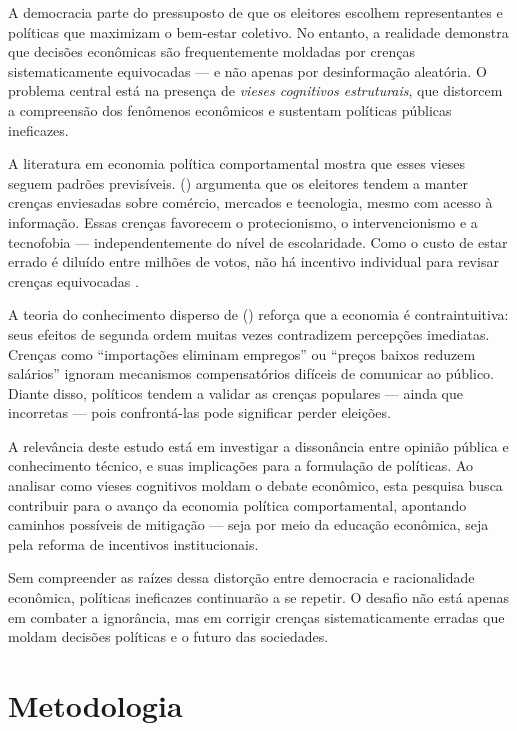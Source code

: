 A democracia parte do pressuposto de que os eleitores escolhem representantes e políticas que maximizam o bem-estar coletivo. No entanto, a realidade demonstra que decisões econômicas são frequentemente moldadas por crenças sistematicamente equivocadas — e não apenas por desinformação aleatória. O problema central está na presença de \textit{vieses cognitivos estruturais}, que distorcem a compreensão dos fenômenos econômicos e sustentam políticas públicas ineficazes.

A literatura em economia política comportamental mostra que esses vieses seguem padrões previsíveis.  (\citeyear{The_Myth_of_the_Rational_Voter}) argumenta que os eleitores tendem a manter crenças enviesadas sobre comércio, mercados e tecnologia, mesmo com acesso à informação. Essas crenças favorecem o protecionismo, o intervencionismo e a tecnofobia — independentemente do nível de escolaridade. Como o custo de estar errado é diluído entre milhões de votos, não há incentivo individual para revisar crenças equivocadas \cite{downs1957economic}.

A teoria do conhecimento disperso de  (\citeyear{hayek_knowledge_use}) reforça que a economia é contraintuitiva: seus efeitos de segunda ordem muitas vezes contradizem percepções imediatas. Crenças como ``importações eliminam empregos'' ou ``preços baixos reduzem salários'' ignoram mecanismos compensatórios difíceis de comunicar ao público. Diante disso, políticos tendem a validar as crenças populares — ainda que incorretas — pois confrontá-las pode significar perder eleições.

A relevância deste estudo está em investigar a dissonância entre opinião pública e conhecimento técnico, e suas implicações para a formulação de políticas. Ao analisar como vieses cognitivos moldam o debate econômico, esta pesquisa busca contribuir para o avanço da economia política comportamental, apontando caminhos possíveis de mitigação — seja por meio da educação econômica, seja pela reforma de incentivos institucionais.

Sem compreender as raízes dessa distorção entre democracia e racionalidade econômica, políticas ineficazes continuarão a se repetir. O desafio não está apenas em combater a ignorância, mas em corrigir crenças sistematicamente erradas que moldam decisões políticas e o futuro das sociedades.


\section{Metodologia} %

